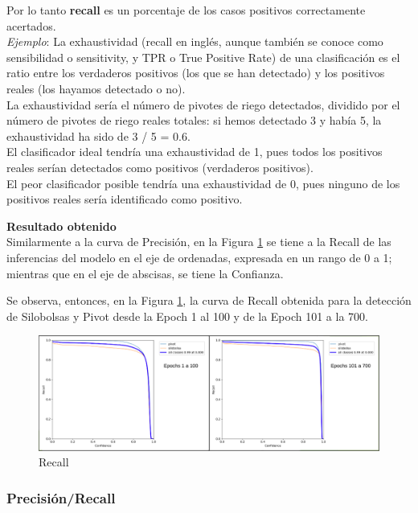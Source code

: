 Por lo tanto \textbf{recall} es un porcentaje de los casos positivos correctamente acertados.\\

\textit{Ejemplo}:
La exhaustividad (recall en inglés, aunque también se conoce como sensibilidad o sensitivity, y TPR o True Positive Rate) de una clasificación es el ratio entre los verdaderos positivos (los que se han detectado) y los positivos reales (los hayamos detectado o no).\\
La exhaustividad sería el número de pivotes de riego detectados, dividido por el número de pivotes de riego reales totales: si hemos detectado 3 y había 5, la exhaustividad ha sido de 3 / 5 = 0.6. \\
El clasificador ideal tendría una exhaustividad de 1, pues todos los positivos reales serían detectados como positivos (verdaderos positivos).\\
El peor clasificador posible tendría una exhaustividad de 0, pues ninguno de los positivos reales sería identificado como positivo.

\newpage
\textbf{Resultado obtenido}\\

Similarmente a la curva de Precisión, en la Figura \ref{fig:recall} se tiene a la Recall de las inferencias del modelo en el eje de ordenadas, expresada en un rango de 0 a 1; mientras que en el eje de abscisas, se tiene la Confianza.

Se observa, entonces, en la Figura \ref{fig:recall}, la curva de Recall obtenida para la detección de Silobolsas y Pivot desde la Epoch 1 al 100 y de la Epoch 101 a la 700.

\begin{figure}[h!]
    \centering
    \includegraphics[width=1\textwidth]{img/Recall.png}
    \caption{Recall}
    \label{fig:recall}
\end{figure}

\subsubsection{Precisión/Recall}

